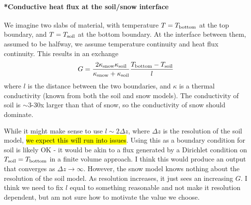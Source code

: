 \documentclass[twoside,10pt]{report}
\begin{document}
\paragraph{*Conductive heat flux at the soil/snow interface}
We imagine two slabs of material, with temperature $T = T_{\rm bottom}$ at the top boundary, and $T = T_{\rm soil}$ at the bottom boundary. At the interface between them, assumed to be halfway, we assume temperature continuity and heat flux continuity. This results in an exchange
\begin{equation}
G=\frac{2\kappa_{\rm snow} \kappa_{\rm soil}}{\kappa_{\rm snow} +\kappa_{\rm soil}}\frac{T_{\rm bottom}-T_{\rm soil}}{l}
\end{equation}
where $l$ is the distance between the two boundaries, and $\kappa$ is a thermal conductivity (known from both the soil and snow models). The conductivity of soil is $\sim$3-30x larger than that of snow, so the conductivity of snow should dominate.

While it might make sense to use $l\sim 2\Delta z$, where $\Delta z$ is the resolution of the soil model, \hl{we expect this will run into issues}. Using this as a boundary condition for soil is likely OK - it would be akin to a flux generated by a Dirichlet condition on $T_{\rm soil} = T_{\rm bottom}$ in a finite volume approach. I think this would produce an output that converges as $\Delta z \rightarrow \infty$. However, the snow model knows nothing about the resolution of the soil model. As resolution increases, it just sees an increasing $G$. I think we need to fix $l$ equal to something reasonable and not make it resolution dependent, but am not sure how to motivate the value we choose.

\end{document}
